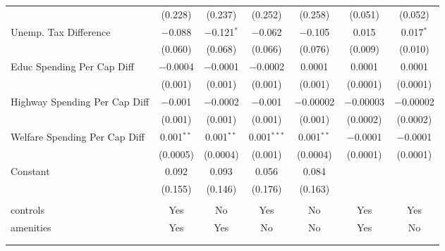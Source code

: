 \begin{table}[!htbp]
\begin{tabular}{@{\extracolsep{5pt}}lcccccc}
  & (0.228) & (0.237) & (0.252) & (0.258) & (0.051) & (0.052) \\ 
  Unemp. Tax Difference & $-$0.088 & $-$0.121$^{*}$ & $-$0.062 & $-$0.105 & 0.015 & 0.017$^{*}$ \\ 
  & (0.060) & (0.068) & (0.066) & (0.076) & (0.009) & (0.010) \\ 
  Educ Spending Per Cap Diff & $-$0.0004 & $-$0.0001 & $-$0.0002 & 0.0001 & 0.0001 & 0.0001 \\ 
  & (0.001) & (0.001) & (0.001) & (0.001) & (0.0001) & (0.0001) \\ 
  Highway Spending Per Cap Diff & $-$0.001 & $-$0.0002 & $-$0.001 & $-$0.00002 & $-$0.00003 & $-$0.00002 \\ 
  & (0.001) & (0.001) & (0.001) & (0.001) & (0.0002) & (0.0002) \\ 
  Welfare Spending Per Cap Diff & 0.001$^{**}$ & 0.001$^{**}$ & 0.001$^{***}$ & 0.001$^{**}$ & $-$0.0001 & $-$0.0001 \\ 
  & (0.0005) & (0.0004) & (0.001) & (0.0004) & (0.0001) & (0.0001) \\ 
  Constant & 0.092 & 0.093 & 0.056 & 0.084 &  &  \\ 
  & (0.155) & (0.146) & (0.176) & (0.163) &  &  \\ 
 \hline \\[-1.8ex] 
controls & Yes & No & Yes & No & Yes & Yes \\ 
amenities & Yes & Yes & No & No & Yes & No \\ 
\hline \\[-1.8ex] 
\hline 
\hline \\[-1.8ex] 
\end{tabular} 
\end{table} 
